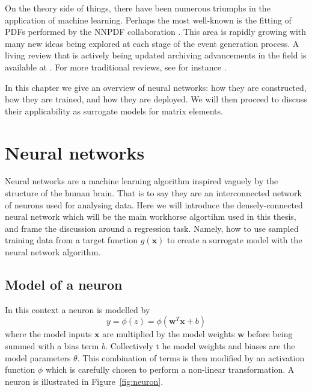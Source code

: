 \documentclass[main.tex]{subfiles}
\begin{document}
    On the theory side of things, there have been numerous
    triumphs in the application of machine learning.
    Perhaps the most well-known is the fitting
    of PDFs performed by the NNPDF collaboration \cite{NNPDF:2021njg}.
    This area is rapidly growing with many new
    ideas being explored at each stage of the event
    generation process.
    A living review that is actively being updated
    archiving advancements in the field is available
    at \cite{Feickert:2021ajf}.
    For more traditional reviews, see for instance
    \cite{Guest:2018yhq,Radovic:2018dip,Butter:2022rso}.

    In this chapter we give an overview of neural
    networks: how they are constructed, how
    they are trained, and how they are deployed.
    We will then proceed to discuss their
    applicability as surrogate models for matrix
    elements.

\section{Neural networks}
    Neural networks are a machine learning algorithm
    inspired vaguely by the structure of the human brain.
    That is to say they are an interconnected network
    of neurons used for analysing data. Here we will
    introduce the densely-connected neural network
    which will be the main workhorse algortihm used
    in this thesis, and frame the discussion around a
    regression task. Namely, how to use sampled training data
    from a target function $g(\mathbf{x})$ to create a surrogate
    model with the neural network algorithm.

\subsection{Model of a neuron}
    In this context a neuron is modelled by
    \begin{equation}\label{eqn:neuron}
        y = \phi(z) = \phi(\mathbf{w}^{T}\mathbf{x} + b)
    \end{equation}
    where the model inputs $\mathbf{x}$ are multiplied
    by the model weights $\mathbf{w}$ before being summed
    with a bias term $b$. Collectively t he model weights
    and biases are the model parameters $\theta$.
    This combination of terms is then modified
    by an activation function $\phi$ which is carefully
    chosen to perform a non-linear transformation. A neuron
    is illustrated in Figure~\ref{fig:neuron}.
    
\end{document}
